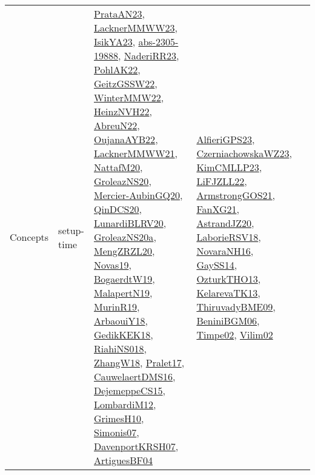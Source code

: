 {\begin{longtable}{lp{3cm}>{\raggedright}p{6cm}>{\raggedright}p{6cm}p{8cm}}
Concepts & setup-time & \href{articles/PrataAN23.pdf}{PrataAN23}\cite{PrataAN23}, \href{articles/LacknerMMWW23.pdf}{LacknerMMWW23}\cite{LacknerMMWW23}, \href{articles/IsikYA23.pdf}{IsikYA23}\cite{IsikYA23}, \href{articles/abs-2305-19888.pdf}{abs-2305-19888}\cite{abs-2305-19888}, \href{articles/NaderiRR23.pdf}{NaderiRR23}\cite{NaderiRR23}, \href{articles/PohlAK22.pdf}{PohlAK22}\cite{PohlAK22}, \href{papers/GeitzGSSW22.pdf}{GeitzGSSW22}\cite{GeitzGSSW22}, \href{papers/WinterMMW22.pdf}{WinterMMW22}\cite{WinterMMW22}, \href{articles/HeinzNVH22.pdf}{HeinzNVH22}\cite{HeinzNVH22}, \href{articles/AbreuN22.pdf}{AbreuN22}\cite{AbreuN22}, \href{papers/OujanaAYB22.pdf}{OujanaAYB22}\cite{OujanaAYB22}, \href{papers/LacknerMMWW21.pdf}{LacknerMMWW21}\cite{LacknerMMWW21}, \href{papers/NattafM20.pdf}{NattafM20}\cite{NattafM20}, \href{papers/GroleazNS20.pdf}{GroleazNS20}\cite{GroleazNS20}, \href{papers/Mercier-AubinGQ20.pdf}{Mercier-AubinGQ20}\cite{Mercier-AubinGQ20}, \href{articles/QinDCS20.pdf}{QinDCS20}\cite{QinDCS20}, \href{articles/LunardiBLRV20.pdf}{LunardiBLRV20}\cite{LunardiBLRV20}, \href{papers/GroleazNS20a.pdf}{GroleazNS20a}\cite{GroleazNS20a}, \href{articles/MengZRZL20.pdf}{MengZRZL20}\cite{MengZRZL20}, \href{articles/Novas19.pdf}{Novas19}\cite{Novas19}, \href{papers/BogaerdtW19.pdf}{BogaerdtW19}\cite{BogaerdtW19}, \href{papers/MalapertN19.pdf}{MalapertN19}\cite{MalapertN19}, \href{papers/MurinR19.pdf}{MurinR19}\cite{MurinR19}, \href{papers/ArbaouiY18.pdf}{ArbaouiY18}\cite{ArbaouiY18}, \href{articles/GedikKEK18.pdf}{GedikKEK18}\cite{GedikKEK18}, \href{papers/RiahiNS018.pdf}{RiahiNS018}\cite{RiahiNS018}, \href{articles/ZhangW18.pdf}{ZhangW18}\cite{ZhangW18}, \href{papers/Pralet17.pdf}{Pralet17}\cite{Pralet17}, \href{papers/CauwelaertDMS16.pdf}{CauwelaertDMS16}\cite{CauwelaertDMS16}, \href{papers/DejemeppeCS15.pdf}{DejemeppeCS15}\cite{DejemeppeCS15}, \href{articles/LombardiM12.pdf}{LombardiM12}\cite{LombardiM12}, \href{papers/GrimesH10.pdf}{GrimesH10}\cite{GrimesH10}, \href{articles/Simonis07.pdf}{Simonis07}\cite{Simonis07}, \href{papers/DavenportKRSH07.pdf}{DavenportKRSH07}\cite{DavenportKRSH07}, \href{papers/ArtiguesBF04.pdf}{ArtiguesBF04}\cite{ArtiguesBF04} & \href{articles/AlfieriGPS23.pdf}{AlfieriGPS23}\cite{AlfieriGPS23}, \href{articles/CzerniachowskaWZ23.pdf}{CzerniachowskaWZ23}\cite{CzerniachowskaWZ23}, \href{papers/KimCMLLP23.pdf}{KimCMLLP23}\cite{KimCMLLP23}, \href{papers/LiFJZLL22.pdf}{LiFJZLL22}\cite{LiFJZLL22}, \href{papers/ArmstrongGOS21.pdf}{ArmstrongGOS21}\cite{ArmstrongGOS21}, \href{articles/FanXG21.pdf}{FanXG21}\cite{FanXG21}, \href{articles/AstrandJZ20.pdf}{AstrandJZ20}\cite{AstrandJZ20}, \href{articles/LaborieRSV18.pdf}{LaborieRSV18}\cite{LaborieRSV18}, \href{articles/NovaraNH16.pdf}{NovaraNH16}\cite{NovaraNH16}, \href{papers/GaySS14.pdf}{GaySS14}\cite{GaySS14}, \href{articles/OzturkTHO13.pdf}{OzturkTHO13}\cite{OzturkTHO13}, \href{papers/KelarevaTK13.pdf}{KelarevaTK13}\cite{KelarevaTK13}, \href{papers/ThiruvadyBME09.pdf}{ThiruvadyBME09}\cite{ThiruvadyBME09}, \href{papers/BeniniBGM06.pdf}{BeniniBGM06}\cite{BeniniBGM06}, \href{articles/Timpe02.pdf}{Timpe02}\cite{Timpe02}, \href{papers/Vilim02.pdf}{Vilim02}\cite{Vilim02} & 
\end{longtable}}
